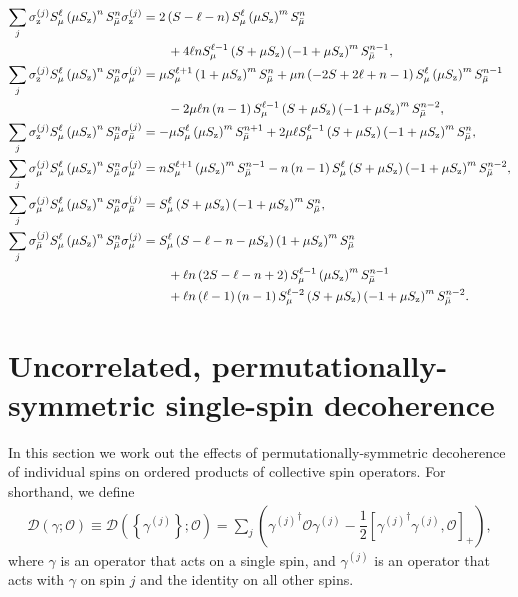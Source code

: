 \documentclass[aps,notitlepage,nofootinbib,11pt]{revtex4-1}
\newcommand{\f}[2]{\dfrac{#1}{#2}} %
\newcommand{\p}[1]{\left(#1\right)} %
\renewcommand{\sp}[1]{\left[#1\right]} %
\renewcommand{\set}[1]{\left\{#1\right\}} %
\newcommand{\D}{\mathcal{D}}
\renewcommand{\O}{\mathcal{O}}
\newcommand{\z}{\text{z}}
\newcommand{\bmu}{{\bar\mu}}
\newcommand{\1}{\mathds{1}}
\begin{document}
\begin{align}
  \sum_j \sigma_\z^{(j)} S_\mu^\ell
  \p{\mu S_\z}^n S_\bmu^n \sigma_\z^{(j)}
  &= 2\p{S-\ell-n} S_\mu^\ell \p{\mu S_\z}^m S_\bmu^n \notag \\
  &\qquad + 4\ell n S_\mu^{\ell-1} \p{S+\mu S_\z}
  \p{-1+\mu S_\z}^m S_\bmu^{n-1},
  \label{eq:san_z_z} \allowdisplaybreaks \\
  \sum_j \sigma_\z^{(j)} S_\mu^\ell
  \p{\mu S_\z}^n S_\bmu^n \sigma_\mu^{(j)}
  &= \mu S_\mu^{\ell+1} \p{1+\mu S_\z}^m S_\bmu^n
  + \mu n \p{-2S+2\ell+n-1} S_\mu^\ell
  \p{\mu S_\z}^m S_\bmu^{n-1} \notag \\
  &\qquad - 2\mu\ell n\p{n-1} S_\mu^{\ell-1}
  \p{S+\mu S_\z} \p{-1+\mu S_\z}^m S_\bmu^{n-2},
  \label{eq:san_z_mu} \allowdisplaybreaks \\
  \sum_j \sigma_\z^{(j)} S_\mu^\ell
  \p{\mu S_\z}^n S_\bmu^n \sigma_\bmu^{(j)}
  &= -\mu S_\mu^\ell \p{\mu S_\z}^m S_\bmu^{n+1}
  + 2\mu \ell S_\mu^{\ell-1} \p{S+\mu S_\z}\p{-1+\mu S_\z}^m S_\bmu^n,
  \label{eq:san_z_bmu} \allowdisplaybreaks \\
  \sum_j \sigma_\mu^{(j)} S_\mu^\ell
  \p{\mu S_\z}^n S_\bmu^n \sigma_\mu^{(j)}
  &= n S_\mu^{\ell+1} \p{\mu S_\z}^m S_\bmu^{n-1}
  - n\p{n-1} S_\mu^\ell \p{S+\mu S_\z} \p{-1+\mu S_\z}^m S_\bmu^{n-2},
  \label{eq:san_mu_mu} \allowdisplaybreaks \\
  \sum_j \sigma_\mu^{(j)} S_\mu^\ell
  \p{\mu S_\z}^n S_\bmu^n \sigma_\bmu^{(j)}
  &= S_\mu^\ell \p{S+\mu S_\z}\p{-1+\mu S_\z}^m S_\bmu^n,
  \label{eq:san_mu_bmu} \allowdisplaybreaks \\
  \sum_j \sigma_\bmu^{(j)} S_\mu^\ell
  \p{\mu S_\z}^n S_\bmu^n \sigma_\mu^{(j)}
  &= S_\mu^\ell \p{S - \ell - n - \mu S_\z}
  \p{1+\mu S_\z}^m S_\bmu^n \notag \\
  &\qquad + \ell n \p{2S - \ell - n + 2}
  S_\mu^{\ell-1} \p{\mu S_\z}^m S_\bmu^{n-1} \notag \\
  &\qquad + \ell n \p{\ell-1} \p{n-1} S_\mu^{\ell-2} \p{S+\mu S_\z}
  \p{-1+\mu S_\z}^m S_\bmu^{n-2}.
  \label{eq:san_bmu_mu}
\end{align}


\section{Uncorrelated, permutationally-symmetric single-spin
  decoherence}
\label{sec:decoherence_single}

In this section we work out the effects of permutationally-symmetric
decoherence of individual spins on ordered products of collective spin
operators.  For shorthand, we define
\begin{align}
  \D\p{\gamma;\O} \equiv \D\p{\set{\gamma^{(j)}};\O}
  = \sum_j\p{{\gamma^{(j)}}^\dag \O \gamma^{(j)}
    - \f12\sp{{\gamma^{(j)}}^\dag \gamma^{(j)}, \O}_+},
\end{align}
where $\gamma$ is an operator that acts on a single spin, and
$\gamma^{(j)}$ is an operator that acts with $\gamma$ on spin $j$ and
the identity on all other spins.
\end{document}
